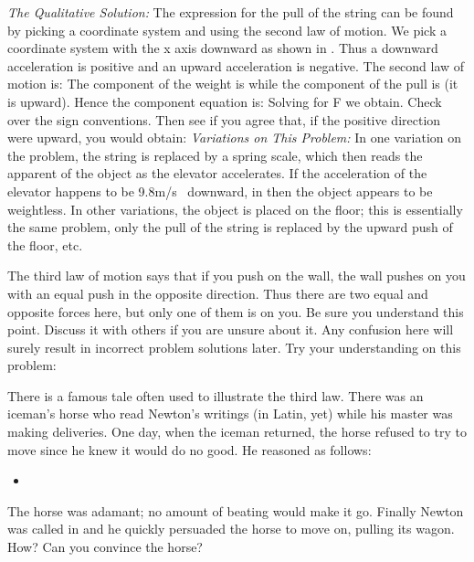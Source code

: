 {\noindent\textit{The Qualitative Solution:}\newline
The expression for the pull of the string can be found by picking a
coordinate system and using the second law of motion.
We pick a coordinate system with the x axis downward as shown in .
Thus a downward acceleration is positive and an upward acceleration is
negative.
The second law of motion is:
%
%
The  component of the weight is  while the  component of the pull
is  (it is upward).
Hence the  component equation is:
%
%
Solving for F we obtain.
%
%
Check over the sign conventions.
Then see if you agree that, if the positive  direction were upward, you
would obtain:
%
%
\noindent\textit{Variations on This Problem:}\newline
In one variation on the problem, the string is replaced by a spring scale,
which then reads the apparent  of the object as the elevator
accelerates.
If the acceleration of the elevator happens to be 9.8\unit{m/s} downward, in
 then the object appears to be weightless.
In other variations, the object is placed on the floor; this is essentially
the same problem, only the pull of the string is replaced by the upward push
of the floor, etc.

The third law of motion says that if you push on the wall, the wall pushes
on you with an equal push in the opposite direction.
Thus there are two equal and opposite forces here, but only one of them is
on you.
Be sure you understand this point.
Discuss it with others if you are unsure about it.
Any confusion here will surely result in incorrect problem solutions later.
Try your understanding on this problem:

There is a famous tale often used to illustrate the third law.
There was an iceman's horse who read Newton's writings (in Latin, yet) while
his master was making deliveries.
One day, when the iceman returned, the horse refused to try to move since he
knew it would do no good.
He reasoned as follows:
%
\begin{itemize}
\item [  ] 
\end{itemize}
%
The horse was adamant; no amount of beating would make it go.
Finally Newton was called in and he quickly persuaded the horse to move on,
pulling its wagon.
How?
Can you convince the horse?
}%
%

